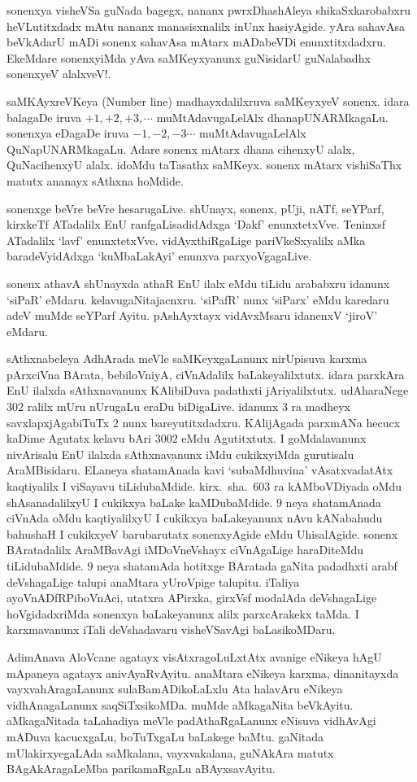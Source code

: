 sonenxya visheVSa guNada bagegx, nananx pwrxDhashAleya shikaSxkarobabxru heVLutitxdadx mAtu nananx manasisxnalilx inUnx hasiyAgide. yAra sahavAsa beVkAdarU mADi sonenx sahavAsa mAtarx mADabeVDi enunxtitxdadxru. EkeMdare sonenxyiMda yAva saMKeyxyanunx guNisidarU guNalabadhx sonenxyeV alalxveV!.

saMKAyxreVKeya {\rm (Number line)} madhayxdalilxruva saMKeyxyeV sonenx. idara bala\-gaDe iruva $+1,+2,+3,\cdots$ muMtAdavugaLelAlx dhanapUNARMkagaLu. sonenxya eDagaDe iruva $-1,-2,-3\cdots$ muMtAdavugaLelAlx QuNapUNARMkagaLu. Adare sonenx mAtarx dhana cihenxyU alalx, QuNacihenxyU alalx. idoMdu taTasathx saMKeyx. sonenx mAtarx vishiSaThx matutx ananayx sAthxna hoMdide.

sonenxge beVre beVre hesarugaLive. shUnayx, sonenx, pUji, nATf, seYParf, kirxkeTf ATadalilx EnU ranfgaLisadidAdxga `Dakf' enunxtetxVve. Teninxsf ATadalilx `lavf' enunxtetxVve. vidAyxthiRgaLige pariVkeSxyalilx aMka baradeVyidAdxga `kuMbaLakAyi' enunxva parxyoVgagaLive.

sonenx athavA shUnayxda athaR EnU ilalx eMdu tiLidu arababxru idanunx `siPaR' eMdaru. kelavugaNitajacnxru. `siPafR' nunx `siParx' eMdu karedaru adeV muMde seYParf Ayitu. pAshAyxtayx vidAvxMsaru idanenxV `jiroV' eMdaru.

sAthxnabeleya AdhArada meVle saMKeyxgaLanunx nirUpisuva karxma pArxciVna BArata, bebiloVniyA, ciVnAdalilx baLakeyalilxtutx. idara parxkAra EnU ilalxda sAthxnavanunx KAlibiDuva padathxti jAriyalilxtutx. udAharaNege $302$ ralilx mUru nUrugaLu eraDu biDigaLive. idanunx $3$ ra madheyx savxlapxjAgabiTuTx $2$ nunx bareyutitxdadxru. KAli\-jAgada parxmANa hecucx kaDime Agutatx kelavu bAri $3002$ eMdu Agutitxtutx. I goMdalavanunx nivArisalu EnU ilalxda sAthxnavanunx iMdu cukikxyiMda gurutisalu AraMBisidaru. ELaneya shatamAnada kavi `subaMdhuvina' vAsatxvadatAtx kaqtiyalilx I viSayavu tiLidubaMdide. kirx.~sha.\ $603$ ra kAMboVDiyada oMdu shAsana\-dalilxyU I cukikxya baLake kaMDubaMdide. $9$ neya shatamAnada ciVnAda oMdu kaqtiyalilxyU I cukikxya baLakeyanunx nAvu kANabahudu bahushaH I cukikxyeV barubarutatx sonenxyAgide eMdu UhisalAgide. sonenx BAratadalilx AraMBavAgi iMDoVneVshayx ciVnAgaLige haraDiteMdu tiLidubaMdide. $9$ neya shatamAda hotitxge BAratada gaNita \-padadhxti arabf deVshagaLige talupi anaMtara yUroVpige talupitu. iTaliya ayoVnADfRPiboVnAci, utatxra APirxka, girxVsf modalAda deVshagaLige hoVgidadxriMda sonenxya baLakeyanunx alilx parxcArakekx taMda. I karxmavanunx iTali deVshadavaru visheVSavAgi \-baLasikoMDaru.  

AdimAnava AloVcane agatayx visAtxragoLuLxtAtx avanige eNikeya hAgU mApaneya agatayx anivAyaRvAyitu. anaMtara eNikeya karxma, dinanitayxda vayxvahAra\-gaLanunx sulaBamADikoLaLxlu Ata halavAru eNikeya vidhAnagaLanunx saqSiTxsikoMDa. muMde aMkagaNita beVkAyitu. aMkagaNitada taLahadiya meVle padAthaRgaLanunx eNisuva vidhAvAgi mADuva kacucxgaLu, boTuTxgaLu baLakege baMtu. gaNitada mUla\-kirxyegaLAda saMkalana, vayxvakalana, guNAkAra matutx BAgAkAragaLeMba parikamaRgaLu aBAyxsavAyitu.

